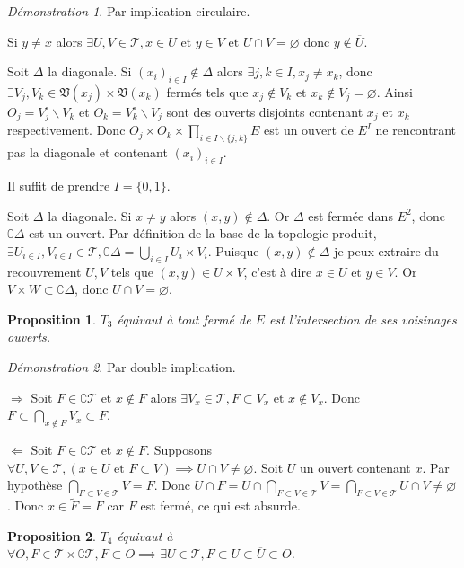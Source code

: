 \documentclass[a4paper, 11pt, french]{book}
\newenvironment{itemise}{\itemize}{\enditemize}
\theoremstyle{plain} %
\newtheorem{proposition}{Proposition}
\theoremstyle{definition} %
\theoremstyle{remark} %
\newtheorem*{demonstration}{Démonstration}
\renewcommand{\setminus}{\backslash}
\newcommand{\1}{\mathds{1}}
\newcommand\vide{\varnothing}
\newcommand\et{\text{ et }}
\renewcommand{\frak}[1]{\mathfrak{#1}}
\newcommand{\scr}[1]{\mathscr{#1}}
\newcommand\equivalence[3]{
	\begin{demonstration}
		#1
		\begin{itemise}
			\item[$\Longrightarrow$] #2
			\item[$\Longleftarrow$] #3
		\end{itemise}
	\end{demonstration}
}
\begin{document}
\begin{demonstration}
	Par implication circulaire.
	\begin{itemise}
		\item Si $y\neq x$ alors $\exists U, V\in\scr{T}, x\in U\et y\in V\et U\cap V=\vide$ donc $y\notin\overline{U}$.
		\item Soit $\Delta$ la diagonale.
		Si $(x_i)_{i\in I}\notin\Delta$ alors $\exists j, k\in I, x_j\neq x_k$, donc $\exists V_j, V_k\in\frak{V}(x_j)\times\frak{V}(x_k)$ fermés tels que $x_j\notin V_k\et x_k\notin V_j=\vide$.
		Ainsi $O_j=V_j^\circ\setminus V_k$ et $O_k=V_k^\circ\setminus V_j$ sont des ouverts disjoints contenant $x_j$ et $x_k$ respectivement.
		Donc $O_j\times O_k\times\prod_{i\in I\setminus\{j, k\}}E$ est un ouvert de $E^I$ ne rencontrant pas la diagonale et contenant $(x_i)_{i\in I}$.
		\item Il suffit de prendre $I=\{0, 1\}$.
		\item Soit $\Delta$ la diagonale.
		Si $x\neq y$ alors $(x, y)\notin\Delta$.
		Or $\Delta$ est fermée dans $E^2$, donc $\complement\Delta$ est un ouvert.
		Par définition de la base de la topologie produit, $\exists U_{i\in I}, V_{i\in I}\in\scr{T}, \complement\Delta=\bigcup_{i\in I} U_i\times V_i$.
		Puisque $(x, y)\notin\Delta$ je peux extraire du recouvrement $U, V$ tels que $(x, y)\in U\times V$, c'est à dire $x\in U\et y\in V$.
		Or $V\times W\subset\complement\Delta$, donc $U\cap V=\vide$.
	\end{itemise}
\end{demonstration}

\begin{proposition}
	$T_3$ équivaut à tout fermé de $E$ est l'intersection de ses voisinages ouverts.
\end{proposition}

\equivalence{Par double implication.}{
	Soit $F\in\complement\scr{T}$ et $x\notin F$ alors $\exists V_x\in\scr{T}, F\subset V_x\et x\notin V_x$.
		Donc $F\subset\bigcap_{x\notin F}V_x\subset F$.
}{
	Soit $F\in\complement\scr{T}$ et $x\notin F$.
		Supposons $\forall U, V\in\scr{T}, (x\in U\et F\subset V)\implies U\cap V\neq\vide$.
		Soit $U$ un ouvert contenant $x$.
		Par hypothèse $\bigcap_{F\subset V\in\scr{T}}V=F$.
		Donc $U\cap F=U\cap\bigcap_{F\subset V\in\scr{T}}V=\bigcap_{F\subset V\in\scr{T}}U\cap V\neq\vide$.
		Donc $x\in\widetilde{F}=F$ car $F$ est fermé, ce qui est absurde.
}

\begin{proposition}
	$T_4$ équivaut à $\forall O, F\in\scr{T}\times\complement\scr{T}, F\subset O\implies\exists U\in\scr{T}, F\subset U\subset\overline{U}\subset O$.
\end{proposition}
\end{document}
